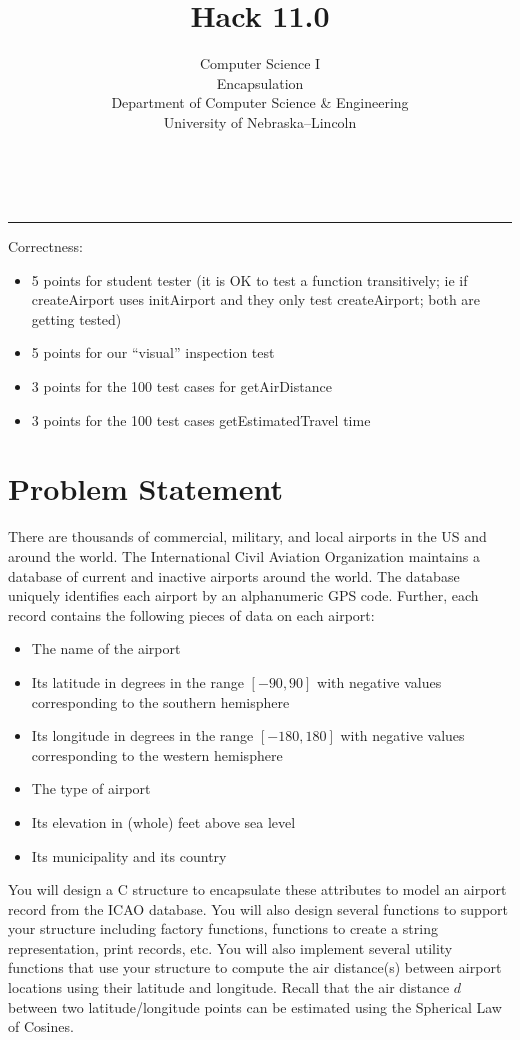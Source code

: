 \documentclass[12pt]{scrartcl}
\title{Hack 11.0}\let\Title\@title
\subtitle{Computer Science I\\
Encapsulation\\
{\small
\vskip1cm
Department of Computer Science \& Engineering \\
University of Nebraska--Lincoln}
\vskip-3cm}
\date{~}
\begin{document}
\maketitle

\hrule



Correctness:
\begin{itemize}
  \item 5 points for student tester (it is OK to test a function transitively; ie if createAirport uses initAirport and they only test createAirport; both are getting tested)
  \item 5 points for our ``visual'' inspection test
  \item 3 points for the 100 test cases for getAirDistance
  \item 3 points for the 100 test cases getEstimatedTravel time
\end{itemize}

\section*{Problem Statement}

There are thousands of commercial, military, and local airports in the US and
around the world.  The International Civil Aviation Organization maintains a
database of current and inactive airports around the world.  The database 
uniquely identifies each airport by an alphanumeric GPS code.  Further, each
record contains the following pieces of data on each airport:
\begin{itemize}
  \item The name of the airport
  \item Its latitude in degrees in the range $[-90, 90]$ with negative values corresponding to the southern hemisphere
  \item Its longitude in degrees in the range $[-180, 180]$ with negative values corresponding to the western hemisphere
  \item The type of airport 
  \item Its elevation in (whole) feet above sea level
  \item Its municipality and its country
\end{itemize}

You will design a C structure to encapsulate these attributes to model an
airport record from the ICAO database.  You will also design several functions
to support your structure including factory functions, functions to 
create a string representation, print records, etc. You will also implement
several utility functions that use your structure to compute the air
distance(s) between airport locations using their latitude and longitude.
Recall that the air distance $d$ between two latitude/longitude points can be 
estimated using the Spherical Law of Cosines.
\end{document}
